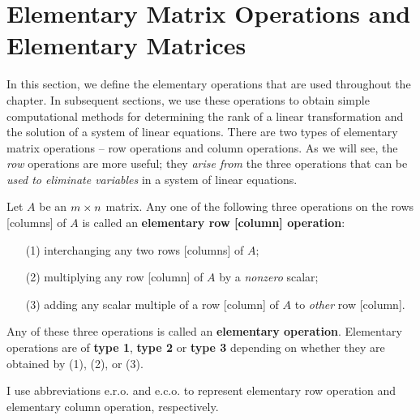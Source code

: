 \section{Elementary Matrix Operations and Elementary Matrices} \label{sec 3.1}

In this section, we define the elementary operations that are used throughout the chapter.
In subsequent sections, we use these operations to obtain simple computational methods for determining the rank of a linear transformation and the solution of a system of linear equations.
There are two types of elementary matrix operations -- row operations and column operations.
As we will see, the \emph{row} operations are more useful;
they \emph{arise from} the three operations that can be \emph{used to eliminate variables} in a system of linear equations.

\begin{definition} \label{def 3.1}
Let \(A\) be an \(m \times n\) matrix.
Any one of the following three operations on the rows [columns] of \(A\) is called an \textbf{elementary row [column] operation}:
\begin{enumerate}
\item[(1)] interchanging any two rows [columns] of \(A\);
\item[(2)] multiplying any row [column] of \(A\) by a \emph{nonzero} scalar;
\item[(3)] adding any scalar multiple of a row [column] of \(A\) to \emph{other} row [column].
\end{enumerate}

Any of these three operations is called an \textbf{elementary operation}.
Elementary operations are of \textbf{type 1}, \textbf{type 2} or \textbf{type 3} depending on whether they are obtained by (1), (2), or (3).
\end{definition}

\begin{note}
I use abbreviations e.r.o. and e.c.o. to represent elementary row operation and elementary column operation, respectively.
\end{note}

